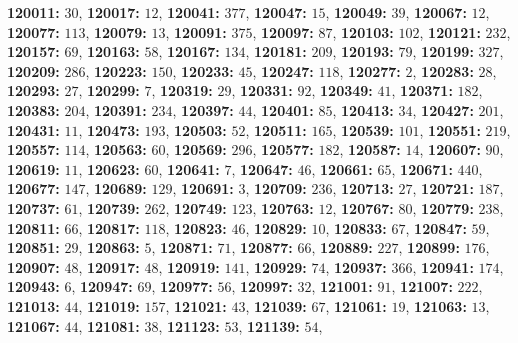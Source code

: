 \textsf{\bfseries 120011:} $30$, \textsf{\bfseries 120017:} $12$, \textsf{\bfseries 120041:} $377$, \textsf{\bfseries 120047:} $15$, \textsf{\bfseries 120049:} $39$, \textsf{\bfseries 120067:} $12$, \textsf{\bfseries 120077:} $113$, \textsf{\bfseries 120079:} $13$, \textsf{\bfseries 120091:} $375$, \textsf{\bfseries 120097:} $87$, \textsf{\bfseries 120103:} $102$, \textsf{\bfseries 120121:} $232$, \textsf{\bfseries 120157:} $69$, \textsf{\bfseries 120163:} $58$, \textsf{\bfseries 120167:} $134$, \textsf{\bfseries 120181:} $209$, \textsf{\bfseries 120193:} $79$, \textsf{\bfseries 120199:} $327$, \textsf{\bfseries 120209:} $286$, \textsf{\bfseries 120223:} $150$, \textsf{\bfseries 120233:} $45$, \textsf{\bfseries 120247:} $118$, \textsf{\bfseries 120277:} $2$, \textsf{\bfseries 120283:} $28$, \textsf{\bfseries 120293:} $27$, \textsf{\bfseries 120299:} $7$, \textsf{\bfseries 120319:} $29$, \textsf{\bfseries 120331:} $92$, \textsf{\bfseries 120349:} $41$, \textsf{\bfseries 120371:} $182$, \textsf{\bfseries 120383:} $204$, \textsf{\bfseries 120391:} $234$, \textsf{\bfseries 120397:} $44$, \textsf{\bfseries 120401:} $85$, \textsf{\bfseries 120413:} $34$, \textsf{\bfseries 120427:} $201$, \textsf{\bfseries 120431:} $11$, \textsf{\bfseries 120473:} $193$, \textsf{\bfseries 120503:} $52$, \textsf{\bfseries 120511:} $165$, \textsf{\bfseries 120539:} $101$, \textsf{\bfseries 120551:} $219$, \textsf{\bfseries 120557:} $114$, \textsf{\bfseries 120563:} $60$, \textsf{\bfseries 120569:} $296$, \textsf{\bfseries 120577:} $182$, \textsf{\bfseries 120587:} $14$, \textsf{\bfseries 120607:} $90$, \textsf{\bfseries 120619:} $11$, \textsf{\bfseries 120623:} $60$, \textsf{\bfseries 120641:} $7$, \textsf{\bfseries 120647:} $46$, \textsf{\bfseries 120661:} $65$, \textsf{\bfseries 120671:} $440$, \textsf{\bfseries 120677:} $147$, \textsf{\bfseries 120689:} $129$, \textsf{\bfseries 120691:} $3$, \textsf{\bfseries 120709:} $236$, \textsf{\bfseries 120713:} $27$, \textsf{\bfseries 120721:} $187$, \textsf{\bfseries 120737:} $61$, \textsf{\bfseries 120739:} $262$, \textsf{\bfseries 120749:} $123$, \textsf{\bfseries 120763:} $12$, \textsf{\bfseries 120767:} $80$, \textsf{\bfseries 120779:} $238$, \textsf{\bfseries 120811:} $66$, \textsf{\bfseries 120817:} $118$, \textsf{\bfseries 120823:} $46$, \textsf{\bfseries 120829:} $10$, \textsf{\bfseries 120833:} $67$, \textsf{\bfseries 120847:} $59$, \textsf{\bfseries 120851:} $29$, \textsf{\bfseries 120863:} $5$, \textsf{\bfseries 120871:} $71$, \textsf{\bfseries 120877:} $66$, \textsf{\bfseries 120889:} $227$, \textsf{\bfseries 120899:} $176$, \textsf{\bfseries 120907:} $48$, \textsf{\bfseries 120917:} $48$, \textsf{\bfseries 120919:} $141$, \textsf{\bfseries 120929:} $74$, \textsf{\bfseries 120937:} $366$, \textsf{\bfseries 120941:} $174$, \textsf{\bfseries 120943:} $6$, \textsf{\bfseries 120947:} $69$, \textsf{\bfseries 120977:} $56$, \textsf{\bfseries 120997:} $32$, \textsf{\bfseries 121001:} $91$, \textsf{\bfseries 121007:} $222$, \textsf{\bfseries 121013:} $44$, \textsf{\bfseries 121019:} $157$, \textsf{\bfseries 121021:} $43$, \textsf{\bfseries 121039:} $67$, \textsf{\bfseries 121061:} $19$, \textsf{\bfseries 121063:} $13$, \textsf{\bfseries 121067:} $44$, \textsf{\bfseries 121081:} $38$, \textsf{\bfseries 121123:} $53$, \textsf{\bfseries 121139:} $54$, 
